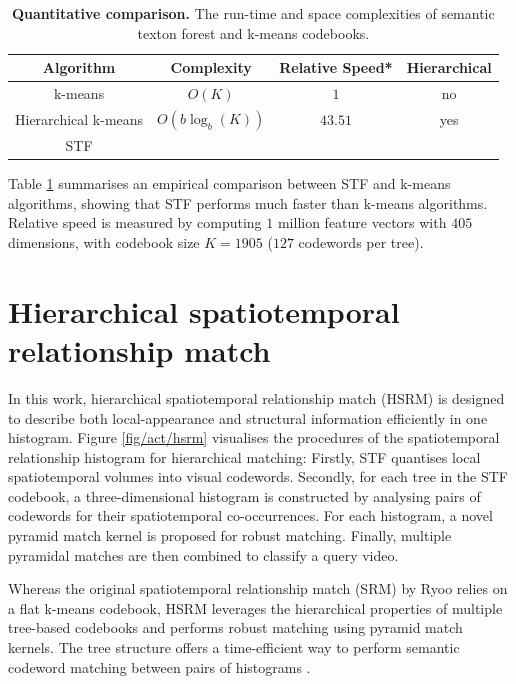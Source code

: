 \begin{table}
	\begin{center}
		\begin{tabular}{|c|c|c|c|}
			\hline
			\textbf{ Algorithm} & \textbf{ Complexity} & \textbf{ Relative Speed}* & \textbf{ Hierarchical} \\
			\hline
			k-means & $O(K)$ & $1$ & no \\
			Hierarchical k-means & $O(b\log_{b}(K))$ & $43.51$ & yes \\
			{STF} & \textbf{\color{blue}{ $ O(\log_{2}(K)) $ }} & \textbf{\color{blue}{$559.86$}} & \textbf{\color{blue}{yes}}\\
			\hline
		\end{tabular}
	\end{center}
	\caption{\textbf{Quantitative comparison.} The run-time and space complexities of semantic texton forest and k-means codebooks.}
	\label{tab/act/codebook}
\end{table}

Table \ref{tab/act/codebook} summarises an empirical comparison between STF and k-means algorithms, showing that STF performs much faster than k-means algorithms. Relative speed is measured by computing $1$ million feature vectors with $405$ dimensions, with codebook size $K = 1905$ ($127$ codewords per tree). 

\section{Hierarchical spatiotemporal relationship match}
\label{sec/act/HSRM}

In this work, hierarchical spatiotemporal relationship match (HSRM) is designed to describe both local-appearance and structural information efficiently in one histogram. 
Figure \ref{fig/act/hsrm} visualises the procedures of the spatiotemporal relationship histogram for hierarchical matching:   
Firstly, STF quantises local spatiotemporal volumes into visual codewords. 
Secondly, for each tree in the STF codebook, a three-dimensional histogram is constructed by analysing pairs of codewords for their spatiotemporal co-occurrences. 
For each histogram, a novel pyramid match kernel is proposed for robust matching. 
Finally, multiple pyramidal matches are then combined to classify a query video. 

Whereas the original spatiotemporal relationship match (SRM) by Ryoo \etal \cite{Ryoo2009} relies on a flat k-means codebook, HSRM leverages the hierarchical properties of multiple tree-based codebooks and performs robust matching using pyramid match kernels. The tree structure offers a time-efficient way to perform semantic codeword matching between pairs of histograms \cite{Grauman2005}.


